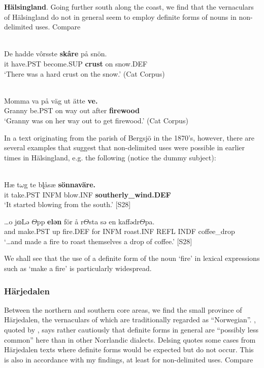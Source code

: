 \textbf{Hälsingland}. Going further south along the coast, we find that the vernaculars of Hälsingland do not in general seem to employ definite forms of nouns in non-delimited uses. Compare 

\ea \label{} 
\\
\gll De  hadde  vôrsste  \textbf{skâre} på  snön.\\
it  have.PST  become.SUP  \textbf{crust} on  snow.DEF\\
\glt ‘There was a hard crust on the snow.’ (Cat Corpus)

\z

\ea \label{} 
\\
\gll Momma  va  på  väg  ut  ätte  \textbf{ve.}\\
Granny  be.PST  on  way  out  after  \textbf{firewood}\\
\glt ‘Granny was on her way out to get firewood.’ (Cat Corpus)

\z

In a text originating from the parish of Bergsjö in the 1870’s, however, there are several examples that suggest that non-delimited uses were possible in earlier times in Hälsingland, e.g. the following (notice the dummy subject):

\ea\label{}
\\
\gll Hæ  t$\omega $g  te  bɭåsæ  \textbf{sönnaväre.}\\
it  take.PST  INFM  blow.INF  \textbf{southerly\_wind.DEF}\\
\glt ‘It started blowing from the south.’ [S28]

\z

\ea
\gll …o  jɷLə  $\Theta $pp  \textbf{elən} för  å  r$\Theta $sta  sə  en  kaffədr$\Theta $pa.\\
and  make.PST  up  fire.DEF  for  INFM  roast.INF  REFL  INDF  coffee\_drop\\
\glt ‘…and made a fire to roast themselves a drop of coffee.’ [S28]

\z

We shall see that the use of a definite form of the noun ‘fire’ in lexical expressions such as ‘make a fire’ is particularly widespread.

\subsubsection{Härjedalen}
 Between the northern and southern core areas, we find the small province of Härjedalen, the vernaculars of which are traditionally regarded as “Norwegian”. \citet[28]{Reinhammar1973}, quoted by \citet[19]{Delsing2003a}, says rather cautiously that definite forms in general are “possibly less common” here than in other Norrlandic dialects. Delsing quotes some cases from Härjedalen texts where definite forms would be expected but do not occur. This is also in accordance with my findings, at least for non-delimited uses. Compare

